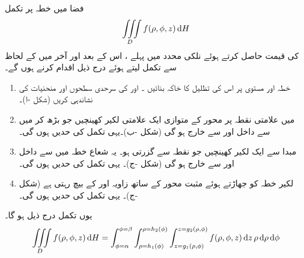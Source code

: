 فضا میں خطہ  پر  تکمل
\[\iiint\limits_D f(\rho,\phi,z)\dif H\]
کی قیمت  حاصل کرتے ہوئے نلکی محدد میں پہلے ، اس کے بعد  اور آخر میں  کے لحاظ سے تکمل لیتے ہوئے  درج ذیل اقدام کرنے ہوں گے۔
\begin{enumerate}[1.]
\item
{}\quad
خطہ  اور مستوی  پر اس کی تظلیل   کا خاکہ بنائیں ۔  اور  کی سرحدی  سطحوں  اور منحنیات کی نشاندہی کریں (شکل -ا)۔
\item
{}\quad
{} میں علامتی نقطہ  پر محور  کے متوازی  ایک علامتی لکیر  کھینچیں جو بڑھ کر   میں  سے داخل اور  سے خارج ہو گی (شکل -ب)۔یہی تکمل کی  حدیں ہوں گی۔
\item
{}\quad
مبدا سے ایک لکیر  کھینچیں جو نقطہ  سے گزرتی ہو۔ یہ شعاع  خطہ  میں  سے داخل اور  سے خارج ہو گی (شکل -ج)۔  یہی تکمل کی  حدیں ہوں گی۔
\item
{}\quad
لکیر  خطہ  کو جھاڑتے ہوئے  مثبت  محور کے ساتھ زاویہ  اور   کے بیچ رہتی ہے (شکل -ج)۔ یہی تکمل کی  حدیں ہوں گی۔
\end{enumerate}
یوں تکمل درج ذیل ہو گا۔
\begin{align}
\iiint\limits_D f(\rho,\phi,z)\dif H=\int_{\phi=\alpha}^{\phi=\beta}\int_{\rho=h_1(\phi)}^{\rho=h_2(\phi)}\int_{z=g_1(\rho,\phi)}^{z=g_2(\rho,\phi)}f(\rho,\phi,z)\dif z \,\rho\dif \rho \dif\phi
\end{align}
